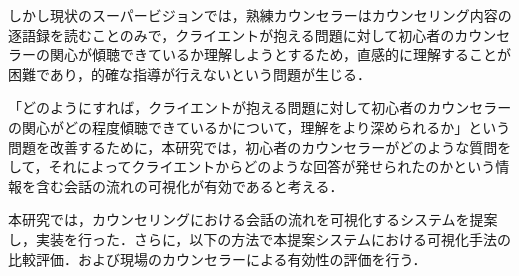 \documentclass[shuuron]{kuee}
\begin{document}

しかし現状のスーパービジョンでは，熟練カウンセラーはカウンセリング内容の逐語録を読むことのみで，クライエントが抱える問題に対して初心者のカウンセラーの関心が傾聴できているか理解しようとするため，直感的に理解することが困難であり，的確な指導が行えないという問題が生じる．








「どのようにすれば，クライエントが抱える問題に対して初心者のカウンセラーの関心がどの程度傾聴できているかについて，理解をより深められるか」という問題を改善するために，本研究では，初心者のカウンセラーがどのような質問をして，それによってクライエントからどのような回答が発せられたのかという情報を含む会話の流れの可視化が有効であると考える．%

本研究では，カウンセリングにおける会話の流れを可視化するシステムを提案し，実装を行った．さらに，以下の方法で本提案システムにおける可視化手法の比較評価．および現場のカウンセラーによる有効性の評価を行う．
\end{document}
